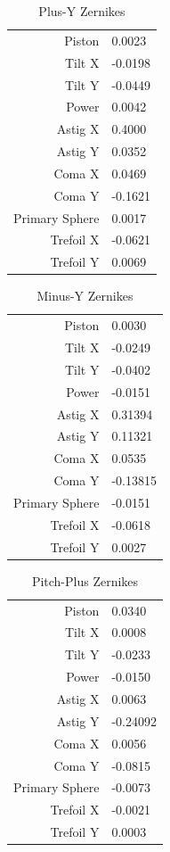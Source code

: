 \documentclass{article}
\begin{document}
\begin{table}[H]
	\centering
	\begin{tabular}{r|p{1in}} \hline
		Piston &0.0023 \\
		Tilt X &-0.0198\\
		Tilt Y &-0.0449\\
		Power & 0.0042\\
		Astig X & 0.4000\\
		Astig Y & 0.0352\\
		Coma X &0.0469\\
		Coma Y &-0.1621\\
		Primary Sphere &0.0017\\
		Trefoil X &-0.0621\\
		Trefoil Y & 0.0069
	\end{tabular}
	\caption{Plus-Y Zernikes}
	\label{yplus}
\end{table}
\begin{table}[H]
	\centering
	\begin{tabular}{r|p{1in}} \hline
		Piston &0.0030\\
		Tilt X &-0.0249\\
		Tilt Y &-0.0402\\
		Power &-0.0151\\
		Astig X &0.31394\\
		Astig Y &0.11321\\
		Coma X &0.0535\\
		Coma Y &-0.13815\\
		Primary Sphere &-0.0151\\
		Trefoil X &-0.0618\\
		Trefoil Y &0.0027
	\end{tabular}
	\caption{Minus-Y Zernikes}
	\label{yminus}
\end{table}
\begin{table}[H]
	\centering
	\begin{tabular}{r|p{1in}} \hline
		Piston &0.0340\\
		Tilt X &0.0008\\
		Tilt Y &-0.0233\\
		Power &-0.0150\\
		Astig X &0.0063\\
		Astig Y &-0.24092\\
		Coma X &0.0056\\
		Coma Y &-0.0815\\
		Primary Sphere &-0.0073\\
		Trefoil X &-0.0021\\
		Trefoil Y &0.0003
	\end{tabular}
	\caption{Pitch-Plus Zernikes}
	\label{pitchplus}
\end{table}
\end{document}
